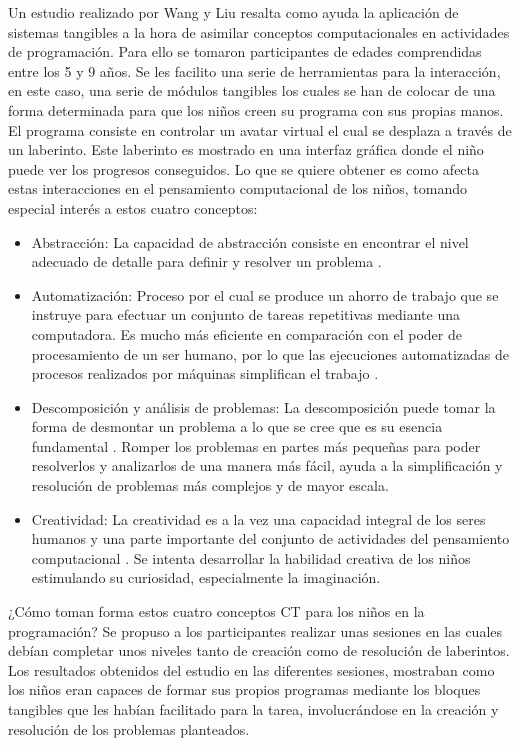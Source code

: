 Un estudio realizado por Wang y Liu \cite{Wang_2015} resalta como ayuda la aplicación de sistemas tangibles a la hora de asimilar conceptos computacionales en actividades de programación. Para ello se tomaron participantes de edades comprendidas entre los 5 y 9 años. Se les facilito una serie de herramientas para la interacción, en este caso, una serie de módulos tangibles los cuales se han de colocar de una forma determinada para que los niños creen su programa con sus propias manos. El programa consiste en controlar un avatar virtual el cual se desplaza a través de un laberinto. Este laberinto es mostrado en una interfaz gráfica donde el niño puede ver los progresos conseguidos. Lo que se quiere obtener es como afecta estas interacciones en el pensamiento computacional de los niños, tomando especial interés a estos cuatro conceptos:
\begin{itemize}
\item Abstracción: La capacidad de abstracción consiste en encontrar el nivel adecuado de detalle para definir y resolver un problema \cite{Heureux}.
\item Automatización: Proceso por el cual se produce un ahorro de trabajo que se instruye para efectuar un conjunto de tareas repetitivas mediante una computadora. Es mucho más eficiente en comparación con el poder de procesamiento de un ser humano, por lo que las ejecuciones automatizadas de procesos realizados por máquinas simplifican el trabajo \cite{Guzdial}.
\item Descomposición y análisis de problemas: La descomposición puede tomar la forma de desmontar un problema a lo que se cree que es su esencia fundamental \cite{Lee}. Romper los problemas en partes más pequeñas para poder resolverlos y analizarlos de una manera más fácil, ayuda a la simplificación y resolución de problemas más complejos y de mayor escala.
\item Creatividad: La creatividad es a la vez una capacidad integral de los seres humanos y una parte importante del conjunto de actividades del pensamiento computacional \cite{Curzon}. Se intenta desarrollar la habilidad creativa de los niños estimulando su curiosidad, especialmente la imaginación.
\end{itemize}

¿Cómo toman forma estos cuatro conceptos CT para los niños en la programación?
Se propuso a los participantes realizar unas sesiones en las cuales debían completar unos niveles tanto de creación como de resolución de laberintos.
Los resultados obtenidos del estudio en las diferentes sesiones, mostraban como los niños eran capaces de formar sus propios programas mediante los bloques tangibles que les habían facilitado para la tarea, involucrándose en la creación y resolución de los problemas planteados. 

